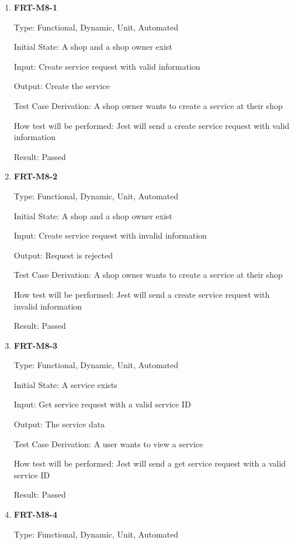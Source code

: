 \documentclass[12pt, titlepage]{article}
\begin{document}
\begin{enumerate}

	\item \textbf{FRT-M8-1}

	      Type: Functional, Dynamic, Unit, Automated

	      Initial State: A shop and a shop owner exist

	      Input: Create service request with valid information

	      Output: Create the service

	      Test Case Derivation: A shop owner wants to create a service at their shop

	      How test will be performed: Jest will send a create service request with valid information

	      Result: Passed

	\item \textbf{FRT-M8-2}

	      Type: Functional, Dynamic, Unit, Automated

	      Initial State: A shop and a shop owner exist

	      Input: Create service request with invalid information

	      Output: Request is rejected

	      Test Case Derivation: A shop owner wants to create a service at their shop

	      How test will be performed: Jest will send a create service request with invalid information

	      Result: Passed

	\item \textbf{FRT-M8-3}

	      Type: Functional, Dynamic, Unit, Automated

	      Initial State: A service exists

	      Input: Get service request with a valid service ID

	      Output: The service data

	      Test Case Derivation: A user wants to view a service

	      How test will be performed: Jest will send a get service request with a valid service ID

	      Result: Passed

	\item \textbf{FRT-M8-4}

	      Type: Functional, Dynamic, Unit, Automated


\end{enumerate}
\end{document}
